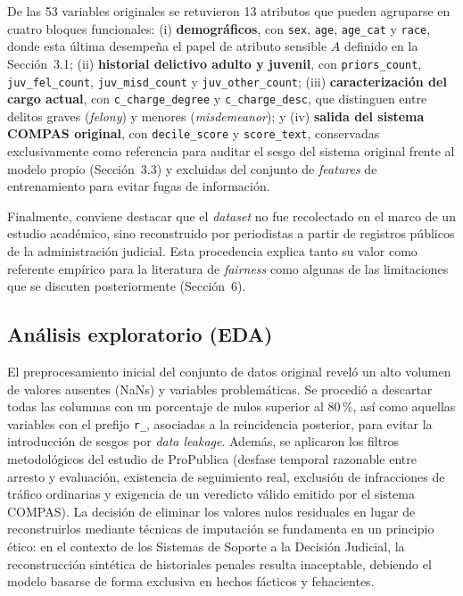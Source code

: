 \documentclass[11pt,a4paper]{article}
\begin{document}
De las 53 variables originales se retuvieron 13 atributos que pueden agruparse en cuatro bloques funcionales: (i) \textbf{demográficos}, con \texttt{sex}, \texttt{age}, \texttt{age\_cat} y \texttt{race}, donde esta última desempeña el papel de atributo sensible $A$ definido en la Sección~3.1; (ii) \textbf{historial delictivo adulto y juvenil}, con \texttt{priors\_count}, \texttt{juv\_fel\_count}, \texttt{juv\_misd\_count} y \texttt{juv\_other\_count}; (iii) \textbf{caracterización del cargo actual}, con \texttt{c\_charge\_degree} y \texttt{c\_charge\_desc}, que distinguen entre delitos graves (\textit{felony}) y menores (\textit{misdemeanor}); y (iv) \textbf{salida del sistema COMPAS original}, con \texttt{decile\_score} y \texttt{score\_text}, conservadas exclusivamente como referencia para auditar el sesgo del sistema original frente al modelo propio (Sección~3.3) y excluidas del conjunto de \textit{features} de entrenamiento para evitar fugas de información.

Finalmente, conviene destacar que el \textit{dataset} no fue recolectado en el marco de un estudio académico, sino reconstruido por periodistas a partir de registros públicos de la administración judicial. Esta procedencia explica tanto su valor como referente empírico para la literatura de \textit{fairness} como algunas de las limitaciones que se discuten posteriormente (Sección~6).

\subsection{Análisis exploratorio (EDA)}

El preprocesamiento inicial del conjunto de datos original reveló un alto volumen de valores ausentes (NaNs) y variables problemáticas. Se procedió a descartar todas las columnas con un porcentaje de nulos superior al 80\,\%, así como aquellas variables con el prefijo \texttt{r\_}, asociadas a la reincidencia posterior, para evitar la introducción de sesgos por \textit{data leakage}. Además, se aplicaron los filtros metodológicos del estudio de ProPublica (desfase temporal razonable entre arresto y evaluación, existencia de seguimiento real, exclusión de infracciones de tráfico ordinarias y exigencia de un veredicto válido emitido por el sistema COMPAS). La decisión de eliminar los valores nulos residuales en lugar de reconstruirlos mediante técnicas de imputación se fundamenta en un principio ético: en el contexto de los Sistemas de Soporte a la Decisión Judicial, la reconstrucción sintética de historiales penales resulta inaceptable, debiendo el modelo basarse de forma exclusiva en hechos fácticos y fehacientes.
\end{document}
